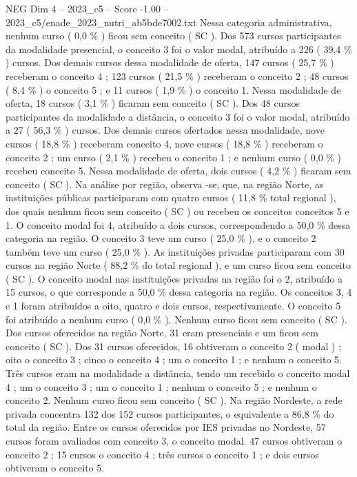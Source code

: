 \begin{textsample}{NEG Dim 4 – 2023\_c5 – Score -1.00 – 2023\_c5/enade\_2023\_nutri\_ab5bde7002.txt}
Nessa categoria administrativa, nenhum curso ( 0,0 \% ) ficou sem conceito ( SC ).
Dos 573 cursos participantes da modalidade presencial, o conceito 3 foi o valor modal, atribuído a 226 ( 39,4 \% ) cursos.
Dos demais cursos dessa modalidade de oferta, 147 cursos ( 25,7 \% ) receberam o conceito 4 ; 123 cursos ( 21,5 \% ) receberam o conceito 2 ; 48 cursos ( 8,4 \% ) o conceito 5 ; e 11 cursos ( 1,9 \% ) o conceito 1.
Nessa modalidade de oferta, 18 cursos ( 3,1 \% ) ficaram sem conceito ( SC ).
Dos 48 cursos participantes da modalidade a distância, o conceito 3 foi o valor modal, atribuído a 27 ( 56,3 \% ) cursos.
Dos demais cursos ofertados nessa modalidade, nove cursos ( 18,8 \% ) receberam conceito 4, nove cursos ( 18,8 \% ) receberam o conceito 2 ; um curso ( 2,1 \% ) recebeu o conceito 1 ; e nenhum curso ( 0,0 \% ) recebeu conceito 5.
Nessa modalidade de oferta, dois cursos ( 4,2 \% ) ficaram sem conceito ( SC ).
Na análise por região, observa -se, que, na região Norte, as instituições públicas participaram com quatro cursos ( 11,8 \% total regional ), dos quais nenhum ficou sem conceito ( SC ) ou recebeu os conceitos conceitos 5 e 1.
O conceito modal foi 4, atribuído a dois cursos, correspondendo a 50,0 \% dessa categoria na região.
O conceito 3 teve um curso ( 25,0 \% ), e o conceito 2 também teve um curso ( 25,0 \% ).
As instituições privadas participaram com 30 cursos na região Norte ( 88,2 \% do total regional ), e um curso ficou sem conceito ( SC ).
O conceito modal nas instituições privadas na região foi o 2, atribuído a 15 cursos, o que corresponde a 50,0 \% dessa categoria na região.
Os conceitos 3, 4 e 1 foram atribuídos a oito, quatro e dois cursos, respectivamente.
O conceito 5 foi atribuído a nenhum curso ( 0,0 \% ).
Nenhum curso ficou sem conceito ( SC ).
Dos cursos oferecidos na região Norte, 31 eram presenciais e um ficou sem conceito ( SC ).
Dos 31 cursos oferecidos, 16 obtiveram o conceito 2 ( modal ) ; oito o conceito 3 ; cinco o conceito 4 ; um o conceito 1 ; e nenhum o conceito 5.
Três cursos eram na modalidade a distância, tendo um recebido o conceito modal 4 ; um o conceito 3 ; um o conceito 1 ; nenhum o conceito 5 ; e nenhum o conceito 2.
Nenhum curso ficou sem conceito ( SC ).
Na região Nordeste, a rede privada concentra 132 dos 152 cursos participantes, o equivalente a 86,8 \% do total da região.
Entre os cursos oferecidos por IES privadas no Nordeste, 57 cursos foram avaliados com conceito 3, o conceito modal. 47 cursos obtiveram o conceito 2 ; 15 cursos o conceito 4 ; três cursos o conceito 1 ; e dois cursos obtiveram o conceito 5.

\end{textsample}
